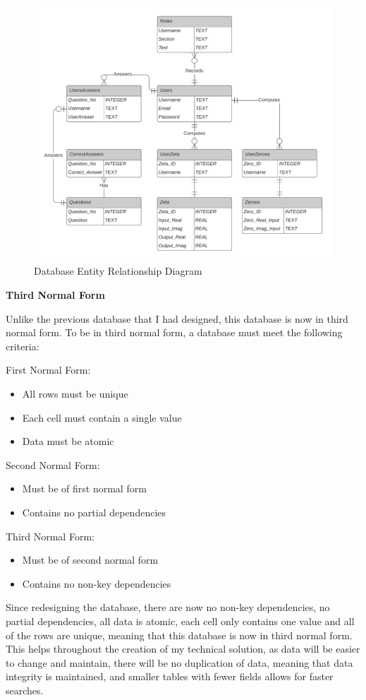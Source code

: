 \documentclass[12pt]{article}
\begin{document}
\begin{figure}[h]
    \centering
    \captionsetup{justification=centering}
    \includegraphics[width=5in]{database-er-diagram}
    \caption{Database Entity Relationship Diagram}
\end{figure}

\textbf{Third Normal Form}

Unlike the previous database that I had designed, this database is now in third normal form. To be in third normal form, a database must meet the following criteria:

First Normal Form:
\begin{itemize}
    \item All rows must be unique
    \item Each cell must contain a single value
    \item Data must be atomic
\end{itemize}
Second Normal Form:
\begin{itemize}
    \item Must be of first normal form
    \item Contains no partial dependencies
\end{itemize}
Third Normal Form:
\begin{itemize}
    \item Must be of second normal form
    \item Contains no non-key dependencies
\end{itemize}
\clearpage
Since redesigning the database, there are now no non-key dependencies, no partial dependencies, all data is atomic, each cell only contains one value and all of the rows are unique, meaning that this database is now in third normal form. This helps throughout the creation of my technical solution, as data will be easier to change and maintain, there will be no duplication of data, meaning that data integrity is maintained, and smaller tables with fewer fields allows for faster searches.
\end{document}
